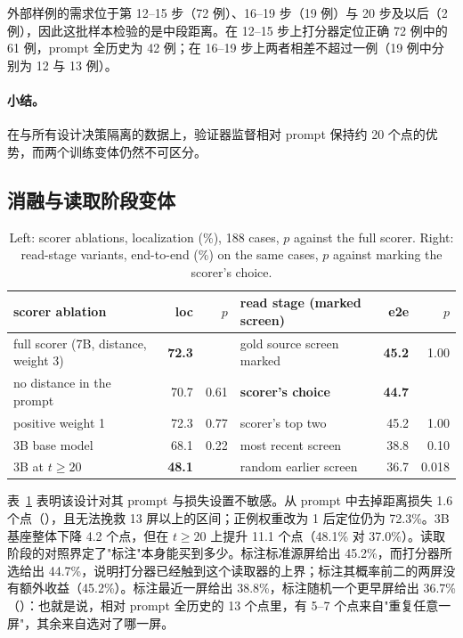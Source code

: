 外部样例的需求位于第 12--15 步（72 例）、16--19 步（19 例）与 20 步及以后（2 例），因此这批样本检验的是中段距离。在 12--15 步上打分器定位正确 72 例中的 61 例，prompt 全历史为 42 例；在 16--19 步上两者相差不超过一例（19 例中分别为 12 与 13 例）。

\paragraph{小结。} 在与所有设计决策隔离的数据上，验证器监督相对 prompt 保持约 20 个点的优势，而两个训练变体仍然不可区分。

\subsection{消融与读取阶段变体}
\label{sec:ablation}
\begin{table}[t]
\centering\scriptsize\engfont
\caption{\rm Left: scorer ablations, localization (\%), 188 cases, $p$ against the full scorer. Right: read-stage variants, end-to-end (\%) on the same cases, $p$ against marking the scorer's choice.}
\label{tab:abl}
\begin{tabular}{lrr@{\hspace{1.5em}}lrr}
\toprule
scorer ablation & loc & $p$ & read stage (marked screen) & e2e & $p$ \\
\midrule
full scorer (7B, distance, weight 3) & \textbf{72.3} & & gold source screen marked & \textbf{45.2} & 1.00 \\
no distance in the prompt & 70.7 & 0.61 & \textbf{scorer's choice} & \textbf{44.7} & \\
positive weight 1 & 72.3 & 0.77 & scorer's top two & 45.2 & 1.00 \\
3B base model & 68.1 & 0.22 & most recent screen & 38.8 & 0.10 \\
\quad 3B at $t\ge20$ & \textbf{48.1} & & random earlier screen & 36.7 & 0.018 \\
\bottomrule
\end{tabular}
\end{table}

表~\ref{tab:abl} 表明该设计对其 prompt 与损失设置不敏感。从 prompt 中去掉距离损失 1.6 个点（），且无法挽救 13 屏以上的区间；正例权重改为 1 后定位仍为 72.3\%。3B 基座整体下降 4.2 个点，但在 $t\ge20$ 上提升 11.1 个点（48.1\% 对 37.0\%）。读取阶段的对照界定了"标注"本身能买到多少。标注标准源屏给出 45.2\%，而打分器所选给出 44.7\%，说明打分器已经触到这个读取器的上界；标注其概率前二的两屏没有额外收益（45.2\%）。标注最近一屏给出 38.8\%，标注随机一个更早屏给出 36.7\%（）：也就是说，相对 prompt 全历史的 13 个点里，有 5--7 个点来自"重复任意一屏"，其余来自选对了哪一屏。

